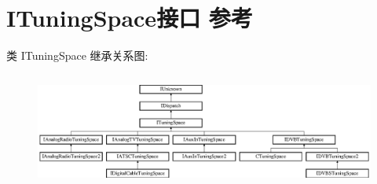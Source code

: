 \hypertarget{interface_i_tuning_space}{}\section{I\+Tuning\+Space接口 参考}
\label{interface_i_tuning_space}
类 I\+Tuning\+Space 继承关系图\+:\begin{figure}[H]
\begin{center}
\leavevmode
\includegraphics[height=3.818182cm]{interface_i_tuning_space}
\end{center}
\end{figure}
